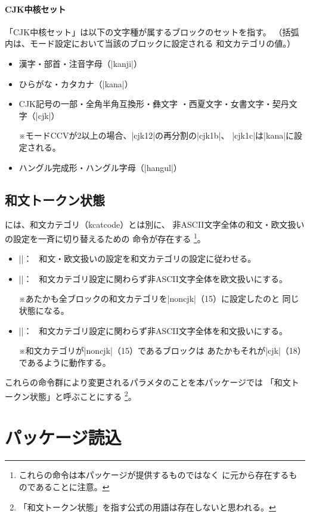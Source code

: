\documentclass[uplatex,dvipdfmx,a4paper]{jsarticle}
\newcommand{\Note}{\par\noindent ※}
\newcommand{\Means}{：~}
\newcommand{\strong}{\textsf}
\begin{document}
\paragraph{CJK中核セット}
「CJK中核セット」は以下の文字種が属するブロックのセットを指す。
（括弧内は、モード設定において当該のブロックに設定される
和文カテゴリの値。）
  \begin{itemize}
  \item 漢字・部首・注音字母（|kanji|）
  \item ひらがな・カタカナ（|kana|）
   \item CJK記号の一部・全角半角互換形・彝文字
    ・西夏文字・女書文字・契丹文字（|cjk|）
    \Note モードCCVが2以上の場合、|cjk12|の再分割の|cjk1b|、
      |cjk1c|は|kana|に設定される。
  \item ハングル完成形・ハングル字母（|hangul|）
\end{itemize}

\subsection{和文トークン状態}
\label{ssec:cjktoken}

{\upTeX}には、和文カテゴリ（kcatcode）とは別に、
非ASCII文字全体の和文・欧文扱いの設定を一斉に切り替えるための
命令が存在する
\footnote{これらの命令は本パッケージが提供するものではなく
  {\upTeX}に元から存在するものであることに注意。}。
\begin{itemize}
\item |\enablecjktoken|\Means
  和文・欧文扱いの設定を和文カテゴリの設定に従わせる。
\item |\disablecjktoken|\Means
  和文カテゴリ設定に関わらず非ASCII文字全体を欧文扱いにする。
  \Note あたかも全ブロックの和文カテゴリを|noncjk|（15）に設定したのと
  同じ状態になる。
\item |\forcecjktoken|\Means
  和文カテゴリ設定に関わらず非ASCII文字全体を和文扱いにする。
  \Note 和文カテゴリが|noncjk|（15）であるブロックは
  あたかもそれが|cjk|（18）であるように動作する。
\end{itemize}

これらの命令群により変更されるパラメタのことを本パッケージでは
「\strong{和文トークン状態}」と呼ぶことにする
\footnote{「和文トークン状態」を指す公式の用語は存在しないと思われる。}。

\section{パッケージ読込}
\label{sec:Loading}
\end{document}
